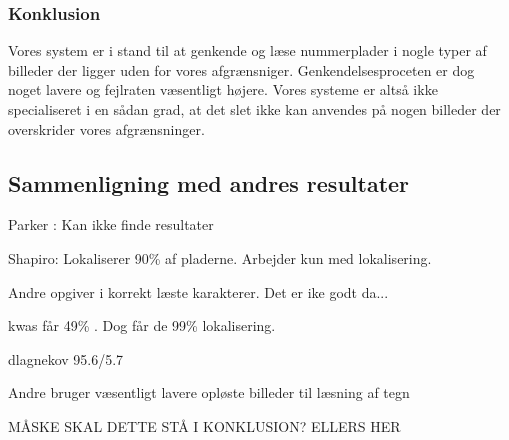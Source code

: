 \subsubsection{Konklusion}
Vores system er i stand til at genkende og læse nummerplader i nogle typer af billeder der ligger uden for vores afgrænsniger. Genkendelsesproceten er dog noget lavere og fejlraten væsentligt højere. Vores systeme er altså ikke specialiseret i en sådan grad, at det slet ikke kan anvendes på nogen billeder der overskrider vores afgrænsninger.


\subsection{Sammenligning med andres resultater}
Parker : Kan ikke finde resultater

Shapiro: Lokaliserer 90\% af pladerne. Arbejder kun med lokalisering.

Andre opgiver i korrekt læste karakterer. Det er ike godt da... \cite{nijhuis}

kwas får 49\% . Dog får de 99\% lokalisering.

dlagnekov 95.6/5.7

Andre bruger væsentligt lavere opløste billeder til læsning af tegn

MÅSKE SKAL DETTE STÅ I KONKLUSION? ELLERS HER
